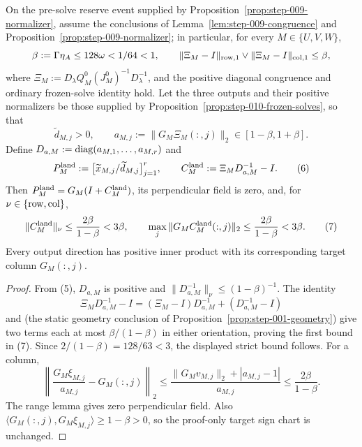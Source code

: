 \begin{proposition}\label{prop:step-010-directions}
On the pre-solve reserve event supplied by Proposition~\ref{prop:step-009-normalizer},
assume the conclusions of Lemma~\ref{lem:step-009-congruence} and
Proposition~\ref{prop:step-009-normalizer}; in particular, for every
\(M\in\{U,V,W\}\),
\[
\beta:=\Gamma\eta_A\le128\omega<1/64<1,\qquad
\|\Xi_M-I\|_{\rm row,1}\vee\|\Xi_M-I\|_{\rm col,1}\le\beta,
\]
where \(\Xi_M:=D_\lambda Q_M^0(J_M^0)^{-1}D_\lambda^{-1}\), and the positive
diagonal congruence and ordinary frozen-solve identity hold.
Let the three outputs and their positive normalizers be those supplied by
Proposition~\ref{prop:step-010-frozen-solves}, so that
\[
\widetilde d_{M,j}>0,\qquad
a_{M,j}:=\|G_M\Xi_M(:,j)\|_2\in[1-\beta,1+\beta].
\]
Define \(D_{a,M}:={\rm diag}(a_{M,1},\ldots,a_{M,r})\) and
\[
P_M^{\rm land}:=\big[\widetilde x_{M,j}/\widetilde d_{M,j}\big]_{j=1}^r,
\qquad C_M^{\rm land}:=\Xi_MD_{a,M}^{-1}-I. \tag{6}
\]
Then \(P_M^{\rm land}=G_M(I+C_M^{\rm land})\), its perpendicular field is
zero, and, for \(\nu\in\{{\rm row},{\rm col}\}\),
\[
\|C_M^{\rm land}\|_\nu\le\frac{2\beta}{1-\beta}<3\beta,\qquad
\max_j\|G_MC_M^{\rm land}(:,j)\|_2
\le\frac{2\beta}{1-\beta}<3\beta. \tag{7}
\]
Every output direction has positive inner product with its corresponding
target column \(G_M(:,j)\).

\begin{proof}
From (5), \(D_{a,M}\) is positive and
\(\|D_{a,M}^{-1}\|_\nu\le(1-\beta)^{-1}\).  The identity
\[
\Xi_MD_{a,M}^{-1}-I
=(\Xi_M-I)D_{a,M}^{-1}+(D_{a,M}^{-1}-I) \tag{8}
\]
and (the static geometry conclusion of Proposition~\ref{prop:step-001-geometry}) give two terms each at most \(\beta/(1-\beta)\) in either
orientation, proving the first bound in (7).  Since
\(2/(1-\beta)=128/63<3\), the displayed strict bound follows.
For a column,
\[
\left\|\frac{G_M\xi_{M,j}}{a_{M,j}}-G_M(:,j)\right\|_2
\le\frac{\|G_Mv_{M,j}\|_2+|a_{M,j}-1|}{a_{M,j}}
\le\frac{2\beta}{1-\beta}.
\]
The range lemma gives zero perpendicular field.  Also
\(\langle G_M(:,j),G_M\xi_{M,j}\rangle\ge1-\beta>0\), so the proof-only
target sign chart is unchanged.


\end{proof}
\end{proposition}
